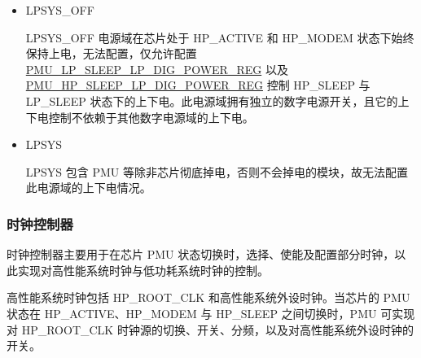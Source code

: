 \documentclass[main\_\_CN.tex]{subfiles}
\begin{document}
\begin{itemize}
\item LPSYS\_OFF

    LPSYS\_OFF 电源域在芯片处于 HP\_ACTIVE 和 HP\_MODEM 状态下始终保持上电，无法配置，仅允许配置 \hyperref[regdesc:PMULPSLEEPLPDIGPOWERREG]{PMU\_LP\_SLEEP\_LP\_DIG\_POWER\_REG} 以及 \hyperref[regdesc:PMUHPSLEEPLPDIGPOWERREG]{PMU\_HP\_SLEEP\_LP\_DIG\_POWER\_REG} 控制 HP\_SLEEP 与 LP\_SLEEP 状态下的上下电。此电源域拥有独立的数字电源开关，且它的上下电控制不依赖于其他数字电源域的上下电。

\item LPSYS

    LPSYS 包含 PMU 等除非芯片彻底掉电，否则不会掉电的模块，故无法配置此电源域的上下电情况。
\end{itemize}

\subsubsection{时钟控制器}

时钟控制器主要用于在芯片 PMU 状态切换时，选择、使能及配置部分时钟，以此实现对高性能系统时钟与低功耗系统时钟的控制。

高性能系统时钟包括 HP\_ROOT\_CLK 和高性能系统外设时钟。当芯片的 PMU 状态在 HP\_ACTIVE、HP\_MODEM 与 HP\_SLEEP 之间切换时，PMU 可实现对 HP\_ROOT\_CLK 时钟源的切换、开关、分频，以及对高性能系统外设时钟的开关。
\end{document}

